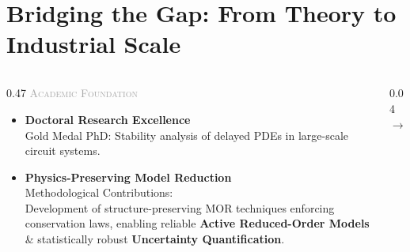 
\section{Bridging the Gap: From Theory to Industrial Scale}

\begin{frame}[t]{\insertsectionhead}
	\vspace{2ex}

	\begin{columns}[t, onlytextwidth]

		\begin{column}{0.47\textwidth}
			\centering
			{\large \scshape\textcolor{darkgray}{Academic Foundation}} \\
			\vspace{0.5ex}

			\begin{block}{}
				\vspace{1ex}
				\begin{itemize}
					\item \textbf{Doctoral Research Excellence} \\
					      \textcolor{blue!80!black}{Gold Medal PhD:}
					      Stability analysis of delayed PDEs in large-scale circuit systems.

					      \vspace{2.5ex}

					\item \textbf{Physics-Preserving Model Reduction} \\
					      \textcolor{blue!80!black}{Methodological Contributions:} \\
					      \small
					      Development of structure-preserving MOR techniques enforcing conservation laws, enabling reliable \textbf{Active Reduced-Order Models} \& statistically robust \textbf{Uncertainty Quantification}.
				\end{itemize}
				\vspace{1ex}
			\end{block}
		\end{column}

		\begin{column}{0.04\textwidth}
			\vspace{16ex}
			\centering
			\Large\textcolor{gray!80}{$\longrightarrow$}
		\end{column}


\end{columns}
\end{frame}
